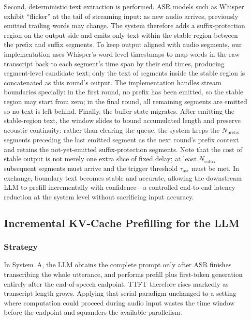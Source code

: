 \documentclass[a4paper,11pt]{article}
\begin{document}
Second, deterministic text extraction is performed. ASR models such as Whisper exhibit ``flicker'' at the tail of streaming input: as new audio arrives, previously emitted trailing words may change. The system therefore adds a suffix-protection region on the output side and emits only text within the stable region between the prefix and suffix segments. To keep output aligned with audio segments, our implementation uses Whisper's word-level timestamps to map words in the raw transcript back to each segment's time span by their end times, producing segment-level candidate text; only the text of segments inside the stable region is concatenated as this round's output. The implementation handles stream boundaries specially: in the first round, no prefix has been emitted, so the stable region may start from zero; in the final round, all remaining segments are emitted so no text is left behind. Finally, the buffer state migrates. After emitting the stable-region text, the window slides to bound accumulated length and preserve acoustic continuity: rather than clearing the queue, the system keeps the $N_{\mathrm{prefix}}$ segments preceding the last emitted segment as the next round's prefix context and retains the not-yet-emitted suffix-protection segments. Note that the cost of stable output is not merely one extra slice of fixed delay; at least $N_{\mathrm{suffix}}$ subsequent segments must arrive and the trigger threshold $\tau_{\mathrm{asr}}$ must be met. In exchange, boundary text becomes stable and accurate, allowing the downstream LLM to prefill incrementally with confidence---a controlled end-to-end latency reduction at the system level without sacrificing input accuracy.

\subsection{Incremental KV-Cache Prefilling for the LLM}
\label{sec:kv-prefill}

\subsubsection{Strategy}

In System~A, the LLM obtains the complete prompt only after ASR finishes transcribing the whole utterance, and performs prefill plus first-token generation entirely after the end-of-speech endpoint. TTFT therefore rises markedly as transcript length grows. Applying that serial paradigm unchanged to a setting where computation could proceed during audio input wastes the time window before the endpoint and squanders the available parallelism.
\end{document}
